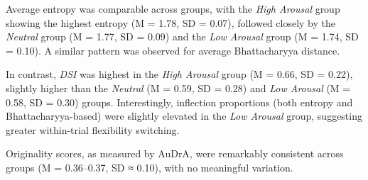 \documentclass[../MA_Thesis.tex]{subfiles}
\begin{document}
Average entropy was comparable across groups, with the \textit{High Arousal} group showing the highest entropy (M = 1.78, SD = 0.07), followed closely by the \textit{Neutral} group (M = 1.77, SD = 0.09) and the \textit{Low Arousal} group (M = 1.74, SD = 0.10). A similar pattern was observed for average Bhattacharyya distance. 

In contrast, \textit{DSI} was highest in the \textit{High Arousal} group (M = 0.66, SD = 0.22), slightly higher than the \textit{Neutral} (M = 0.59, SD = 0.28) and \textit{Low Arousal} (M = 0.58, SD = 0.30) groups. Interestingly, inflection proportions (both entropy and Bhattacharyya-based) were slightly elevated in the \textit{Low Arousal} group, suggesting greater within-trial flexibility switching.

Originality scores, as measured by AuDrA, were remarkably consistent across groups (M = 0.36–0.37, SD ≈ 0.10), with no meaningful variation.
\end{document}
